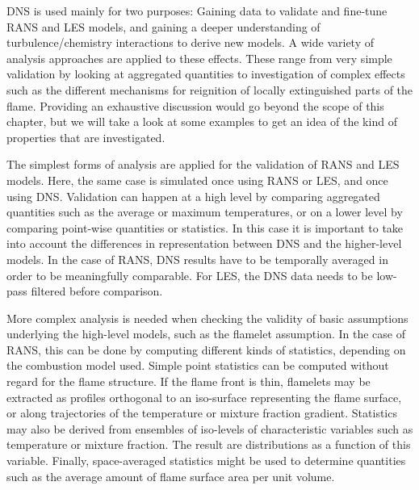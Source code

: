 %
\ac{DNS} is used mainly for two purposes:
%
Gaining data to validate and fine-tune \ac{RANS} and \ac{LES} models, and
gaining a deeper understanding of turbulence/chemistry interactions to derive
new models.
%
A wide variety of analysis approaches are applied to these effects.
%
These range from very simple validation by looking at aggregated quantities to
investigation of complex effects such as the different mechanisms for reignition
of locally extinguished parts of the flame.
%
Providing an exhaustive discussion would go beyond the scope of this chapter,
but we will take a look at some examples to get an idea of the kind of
properties that are investigated.
%

%
The simplest forms of analysis are applied for the validation of \ac{RANS} and
\ac{LES} models.
%
Here, the same case is simulated once using \ac{RANS} or \ac{LES}, and once
using \ac{DNS}.
%
Validation can happen at a high level by comparing aggregated quantities such as
the average or maximum temperatures, or on a lower level by comparing point-wise
quantities or statistics.
%
In this case it is important to take into account the differences in
representation between \ac{DNS} and the higher-level models.
%
In the case of \ac{RANS}, \ac{DNS} results have to be temporally averaged in
order to be meaningfully comparable.
%
For \ac{LES}, the \ac{DNS} data needs to be low-pass filtered before comparison.
%

%
More complex analysis is needed when checking the validity of basic assumptions
underlying the high-level models, such as the flamelet assumption.
%
In the case of \ac{RANS}, this can be done by computing different kinds of
statistics, depending on the combustion model used.
%
Simple point statistics can be computed without regard for the flame structure.
%
If the flame front is thin, flamelets may be extracted as profiles orthogonal
to an iso-surface representing the flame surface, or along trajectories of the
temperature or mixture fraction gradient.
%
Statistics may also be derived from ensembles of iso-levels of characteristic
variables such as temperature or mixture fraction.
%
The result are distributions as a function of this variable.
%
Finally, space-averaged statistics might be used to determine quantities such as
the average amount of flame surface area per unit volume.
%

